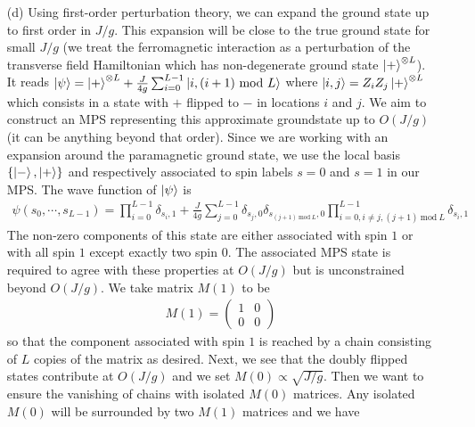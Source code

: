 \documentclass[10pt, a4paper]{article}
\begin{document}
{\begin{enumerate}
  \begin{align*}
    M(0) = M(1) = \begin{pmatrix}
      a&0\\
      0&0
    \end{pmatrix}
  \end{align*}
  with $a \in \mathbb{C}$. The constant $a$ is taken to be $2^{-1/2}$ so that $L$ multiplication of the matrices produces a matrix with only one non-zero diagonal entry $2^{-L/2}$ (equal to the trace).
  \newpage
  \item[(d)] Using first-order perturbation theory, we can expand the ground state up to first order in $J/g$. This expansion will be close to the true ground state for small $J/g$ (we treat the ferromagnetic interaction as a perturbation of the transverse field Hamiltonian which has non-degenerate ground state $\ket{+}^{\otimes L}$). It reads $\ket{\psi} = \ket{+}^{\otimes L} + \frac{J}{4g} \sum_{i=0}^{L-1} \ket{i, (i + 1) \ \text{mod}\ L}$ where $\ket{i, j} = Z_i Z_j \ket{+}^{\otimes L}$ which consists in a state with $+$ flipped to $-$ in locations $i$ and $j$. We aim to construct an MPS representing this approximate groundstate up to $O(J/g)$ (it can be anything beyond that order). Since we are working with an expansion around the paramagnetic ground state, we use the local basis $\{\ket{-}, \ket{+}\}$ and respectively associated to spin labels $s = 0$ and $s = 1$ in our MPS. The wave function of $\ket{\psi}$ is 
  \begin{align*}
    \psi(s_0, \cdots, s_{L-1}) = \prod_{i=0}^{L-1} \delta_{s_i, 1} + \frac{J}{4g} \sum_{j = 0}^{L-1} \delta_{s_{j}, 0}\delta_{s_{(j+1)\ \text{mod}\ L}, 0} \prod_{i=0, i\neq j, (j+1)\ \text{mod}\ L}^{L-1} \delta_{s_i, 1}
  \end{align*}
  The non-zero components of this state are either associated with spin $1$ or with all spin $1$ except exactly two spin $0$. The associated MPS state is required to agree with these properties at $O(J/g)$ but is unconstrained beyond $O(J/g)$. We take matrix $M(1)$ to be 
  \begin{align*}
    M(1) = 
    \begin{pmatrix}
      1&0\\
      0&0
    \end{pmatrix}
  \end{align*}
  so that the component associated with spin $1$ is reached by a chain consisting of $L$ copies of the matrix as desired. Next, we see that the doubly flipped states contribute at $O(J/g)$ and we set $M(0) \propto \sqrt{J/g}$. Then we want to ensure the vanishing of chains with isolated $M(0)$ matrices. Any isolated $M(0)$ will be surrounded by two $M(1)$ matrices and we have  

\end{enumerate}}
\end{document}
